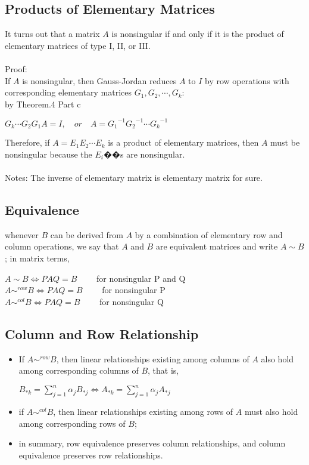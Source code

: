\documentclass[UTF8,a4paper, 10pt, openany]{svmono}
\begin{document}
\subsection{Products of Elementary Matrices}
It turns out that a matrix $A$ is nonsingular if and only if it is the product of elementary matrices of type I, II, or III.
\\ \\
Proof:\\
If $A$ is nonsingular, then Gauss-Jordan reduces $A$ to $I$ by row operations with corresponding elementary matrices $G_1, G_2, \cdots , G_k$:\\
by Theorem.4 Part c
\begin{center}
$G_k\cdots G_2G_1A=I,\quad or \quad A={G_1}^{-1}{G_2}^{-1}\cdots {G_k}^{-1}$
\end{center}
Therefore, if $A = E_1E_2 \cdots E_k$ is a product of elementary matrices,
then $A$ must be nonsingular because the $E_i$��s are nonsingular.\\ \\
Notes: The inverse of elementary matrix is elementary matrix for sure.
\subsection{Equivalence}
whenever $B$ can be derived from $A$ by a combination of elementary row and column operations, we say that $A$ and $B$ are equivalent matrices and write $A \sim B$; in matrix terms,
\begin{center}
$A \sim B \iff PAQ=B \qquad$ for nonsingular P and Q\\
$A \sim ^{row} B \iff PAQ=B \qquad$ for nonsingular P\\
$A \sim ^{col} B \iff PAQ=B \qquad$ for nonsingular Q
\end{center}
\subsection{Column and Row Relationship}
\begin{itemize}
\item If $A \sim ^{row} B$, then linear relationships existing among columns of $A$ also hold among corresponding columns of $B$, that is,
\begin{center}
$B_{*k}=\displaystyle\sum_{j=1}^{n}\alpha_{j}B_{*j} \iff A_{*k}=\displaystyle\sum_{j=1}^{n}\alpha_{j}A_{*j}$
\end{center}
\item if $A \sim ^{col} B$, then linear relationships existing among rows of $A$ must
also hold among corresponding rows of $B$;
\item in summary, row equivalence preserves column relationships, and column equivalence preserves row relationships.
\end{itemize}
\end{document}
